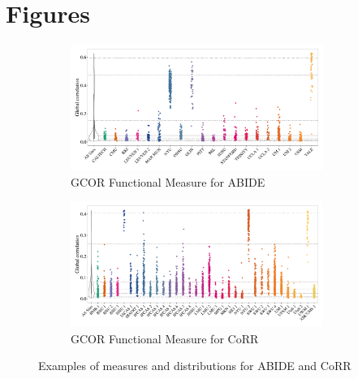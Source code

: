 \documentclass{frontiersSCNS} %
\begin{document}



\section*{Figures}
\begin{figure}[h]
  \centering
     \begin{subfigure}[b]{0.9\textwidth}
       \includegraphics[width=0.9\textwidth]{fig1_ABIDE_Functional_zgcor}
       \caption{GCOR Functional Measure for ABIDE}
     \end{subfigure}
     \begin{subfigure}[b]{0.9\textwidth}
       \includegraphics[width=0.9\textwidth]{fig1_CORR_Functional_gcor}
       \caption{GCOR Functional Measure for CoRR}
     \end{subfigure} 
     \caption{Examples of measures and distributions for ABIDE and CoRR}
\end{figure}
\end{document}
